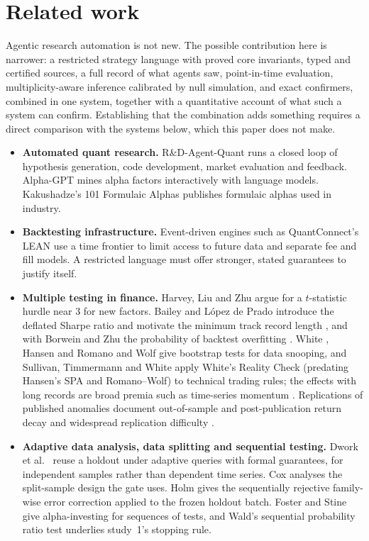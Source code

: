 \documentclass[11pt]{article}
\begin{document}
\section{Related work}\label{sec:related}

Agentic research automation is not new. The possible contribution here is narrower: a restricted strategy language with proved core invariants, typed and certified sources, a full record of what agents saw, point-in-time evaluation, multiplicity-aware inference calibrated by null simulation, and exact confirmers, combined in one system, together with a quantitative account of what such a system can confirm. Establishing that the combination adds something requires a direct comparison with the systems below, which this paper does not make.
\begin{itemize}
  \item \textbf{Automated quant research.} R\&D-Agent-Quant \cite{li2025} runs a closed loop of hypothesis generation, code development, market evaluation and feedback. Alpha-GPT \cite{wang2023} mines alpha factors interactively with language models. Kakushadze's 101 Formulaic Alphas \cite{kakushadze2016} publishes formulaic alphas used in industry.
  \item \textbf{Backtesting infrastructure.} Event-driven engines such as QuantConnect's LEAN \cite{lean} use a time frontier to limit access to future data and separate fee and fill models. A restricted language must offer stronger, stated guarantees to justify itself.
  \item \textbf{Multiple testing in finance.} Harvey, Liu and Zhu \cite{harvey2016} argue for a $t$-statistic hurdle near 3 for new factors. Bailey and L\'opez de Prado introduce the deflated Sharpe ratio \cite{bailey2014} and motivate the minimum track record length \cite{bailey2012}, and with Borwein and Zhu the probability of backtest overfitting \cite{bailey2017}. White \cite{white2000}, Hansen \cite{hansen2005} and Romano and Wolf \cite{romano2005} give bootstrap tests for data snooping, and Sullivan, Timmermann and White \cite{sullivan1999} apply White's Reality Check (predating Hansen's SPA and Romano--Wolf) to technical trading rules; the effects with long records are broad premia such as time-series momentum \cite{moskowitz2012,hurst2017}. Replications of published anomalies document out-of-sample and post-publication return decay \cite{mclean2016} and widespread replication difficulty \cite{hou2020}.
  \item \textbf{Adaptive data analysis, data splitting and sequential testing.} Dwork et al.\ \cite{dwork2015} reuse a holdout under adaptive queries with formal guarantees, for independent samples rather than dependent time series. Cox \cite{cox1975} analyses the split-sample design the gate uses. Holm \cite{holm1979} gives the sequentially rejective family-wise error correction applied to the frozen holdout batch. Foster and Stine \cite{foster2008} give alpha-investing for sequences of tests, and Wald's sequential probability ratio test \cite{wald1945} underlies study~1's stopping rule.

\end{itemize}
\end{document}

